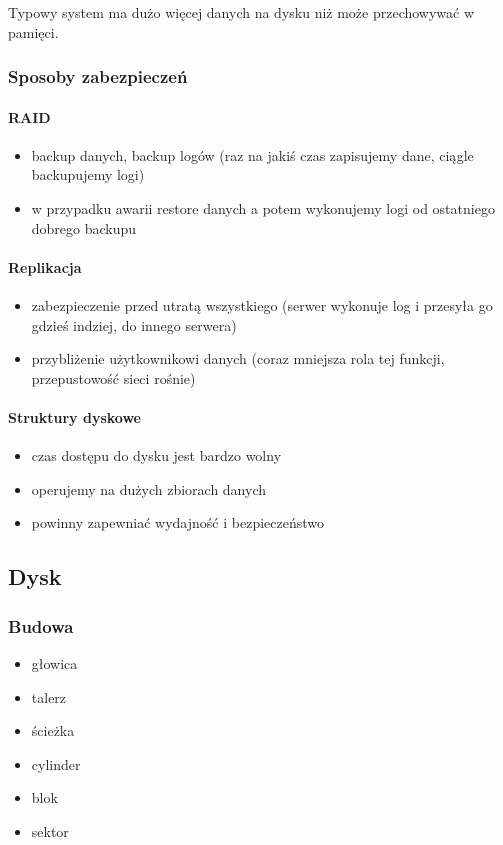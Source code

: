 \documentclass[12pt]{article}
\begin{document}
Typowy system ma dużo więcej danych na dysku niż może przechowywać w pamięci.

\subsubsection{Sposoby zabezpieczeń}
\paragraph{\acs{RAID}}
\begin{itemize}
\item backup danych, backup logów (raz na jakiś czas zapisujemy dane, ciągle backupujemy logi)
\item w przypadku awarii restore danych a potem wykonujemy logi od ostatniego dobrego backupu
\end{itemize}

\paragraph{Replikacja}
\begin{itemize}
\item zabezpieczenie przed utratą wszystkiego (serwer wykonuje log i przesyła go gdzieś indziej, do innego serwera)
\item przybliżenie użytkownikowi danych (coraz mniejsza rola tej funkcji, przepustowość sieci rośnie)
\end{itemize}

\paragraph{Struktury dyskowe}
\begin{itemize}
\item czas dostępu do dysku jest bardzo wolny
\item operujemy na dużych zbiorach danych
\item powinny zapewniać wydajność i bezpieczeństwo
\end{itemize}

\subsection{Dysk}
\subsubsection{Budowa}
\begin{itemize}
\item głowica
\item talerz
\item ścieżka
\item cylinder
\item blok
\item sektor
\end{itemize}
\end{document}
